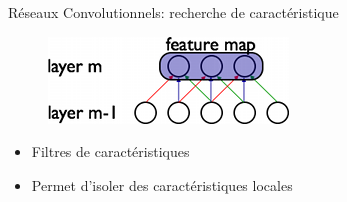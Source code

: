 \documentclass{beamer}
\begin{document}
\begin{frame}{Réseaux Convolutionnels: recherche de caractéristique}

    \begin{figure}
      \centering
      \includegraphics[scale=0.7]{../Figures/conv}
    \end{figure}

    \begin{itemize}
    \item Filtres de caractéristiques
    \item Permet d'isoler des caractéristiques locales
    \end{itemize}
\end{frame}
\end{document}

